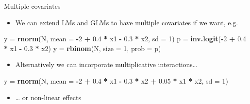 \documentclass[ignorenonframetext,]{beamer}
\newenvironment{Shaded}{\begin{snugshade}}{\end{snugshade}}
\newcommand{\KeywordTok}[1]{\textcolor[rgb]{0.13,0.29,0.53}{\textbf{#1}}}
\newcommand{\DataTypeTok}[1]{\textcolor[rgb]{0.13,0.29,0.53}{#1}}
\newcommand{\DecValTok}[1]{\textcolor[rgb]{0.00,0.00,0.81}{#1}}
\newcommand{\FloatTok}[1]{\textcolor[rgb]{0.00,0.00,0.81}{#1}}
\newcommand{\StringTok}[1]{\textcolor[rgb]{0.31,0.60,0.02}{#1}}
\newcommand{\OperatorTok}[1]{\textcolor[rgb]{0.81,0.36,0.00}{\textbf{#1}}}
\newcommand{\NormalTok}[1]{#1}
\providecommand{\tightlist}{%
  \setlength{\itemsep}{0pt}\setlength{\parskip}{0pt}}
\begin{document}
\begin{frame}[fragile]{Multiple covariates}

\begin{itemize}
\tightlist
\item
  We can extend LMs and GLMs to have multiple covariates if we want,
  e.g.
\end{itemize}

\begin{Shaded}
\begin{Highlighting}[]
\NormalTok{y =}\StringTok{ }\KeywordTok{rnorm}\NormalTok{(N, }\DataTypeTok{mean =} \OperatorTok{-}\DecValTok{2} \OperatorTok{+}\StringTok{ }\FloatTok{0.4} \OperatorTok{*}\StringTok{ }\NormalTok{x1 }\OperatorTok{-}\StringTok{ }\FloatTok{0.3} \OperatorTok{*}\StringTok{ }\NormalTok{x2, }\DataTypeTok{sd =} \DecValTok{1}\NormalTok{)}
\NormalTok{p =}\StringTok{ }\KeywordTok{inv.logit}\NormalTok{(}\OperatorTok{-}\DecValTok{2} \OperatorTok{+}\StringTok{ }\FloatTok{0.4} \OperatorTok{*}\StringTok{ }\NormalTok{x1 }\OperatorTok{-}\StringTok{ }\FloatTok{0.3} \OperatorTok{*}\StringTok{ }\NormalTok{x2)}
\NormalTok{y =}\StringTok{ }\KeywordTok{rbinom}\NormalTok{(N, }\DataTypeTok{size =} \DecValTok{1}\NormalTok{, }\DataTypeTok{prob =}\NormalTok{ p)}
\end{Highlighting}
\end{Shaded}

\begin{itemize}
\tightlist
\item
  Alternatively we can incorporate multiplicative interactions\ldots{}
\end{itemize}

\begin{Shaded}
\begin{Highlighting}[]
\NormalTok{y =}\StringTok{ }\KeywordTok{rnorm}\NormalTok{(N, }\DataTypeTok{mean =} \OperatorTok{-}\DecValTok{2} \OperatorTok{+}\StringTok{ }\FloatTok{0.4} \OperatorTok{*}\StringTok{ }\NormalTok{x1 }\OperatorTok{-}\StringTok{ }\FloatTok{0.3} \OperatorTok{*}\StringTok{ }\NormalTok{x2 }\OperatorTok{+}\StringTok{ }
\StringTok{            }\FloatTok{0.05} \OperatorTok{*}\StringTok{ }\NormalTok{x1 }\OperatorTok{*}\StringTok{ }\NormalTok{x2, }\DataTypeTok{sd =} \DecValTok{1}\NormalTok{)}
\end{Highlighting}
\end{Shaded}

\begin{itemize}
\tightlist
\item
  \ldots{} or non-linear effects
\end{itemize}


\end{frame}
\end{document}
